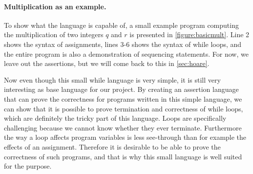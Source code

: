 \paragraph{Multiplication as an example.}
To show what the language is capable of, a small example program computing the multiplication of two integers $q$ and $r$ is presented in \autoref{figure:basicmult}. Line 2 shows the syntax of assignments, lines $3$-$6$ shows the syntax of while loops, and the entire program is also a demonstration of sequencing statements.
For now, we leave out the assertions, but we will come back to this in \autoref{sec:hoare}.

Now even though this small while language is very simple, it is still very interesting as base language for our project.
By creating an assertion language that can prove the correctness for programs written in this simple language, we can show that it is possible to prove termination and correctness of while loops, which are definitely the tricky part of this language.
Loops are specifically challenging because we cannot know whether they ever terminate. Furthermore the way a loop affects program variables is less see-through than for example the effects of an assignment.
Therefore it is desirable to be able to prove the correctness of such programs, and that is why this small language is well suited for the purpose.

